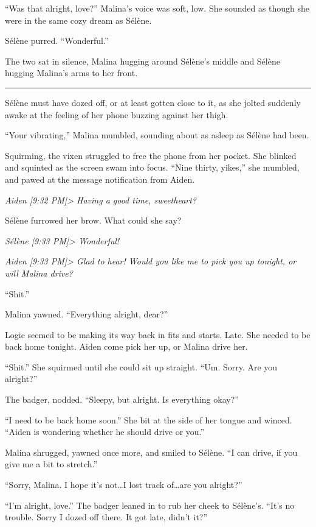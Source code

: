 ``Was that alright, love?'' Malina's voice was soft, low. She sounded as though she were in the same cozy dream as Sélène.

Sélène purred. ``Wonderful.''

The two sat in silence, Malina hugging around Sélène's middle and Sélène hugging Malina's arms to her front.

\begin{center}\rule{0.5\linewidth}{\linethickness}\end{center}

Sélène must have dozed off, or at least gotten close to it, as she jolted suddenly awake at the feeling of her phone buzzing against her thigh.

``Your vibrating,'' Malina mumbled, sounding about as asleep as Sélène had been.

Squirming, the vixen struggled to free the phone from her pocket. She blinked and squinted as the screen swam into focus. ``Nine thirty, yikes,'' she mumbled, and pawed at the message notification from Aiden.

\emph{Aiden {[}9:32 PM{]}\textgreater{} Having a good time, sweetheart?}

Sélène furrowed her brow. What could she say?

\emph{Sélène {[}9:33 PM{]}\textgreater{} Wonderful!}

\emph{Aiden {[}9:33 PM{]}\textgreater{} Glad to hear! Would you like me to pick you up tonight, or will Malina drive?}

``Shit.''

Malina yawned. ``Everything alright, dear?''

Logic seemed to be making its way back in fits and starts. Late. She needed to be back home tonight. Aiden come pick her up, or Malina drive her.

``Shit.'' She squirmed until she could sit up straight. ``Um. Sorry. Are you alright?''

The badger, nodded. ``Sleepy, but alright. Is everything okay?''

``I need to be back home soon.'' She bit at the side of her tongue and winced. ``Aiden is wondering whether he should drive or you.''

Malina shrugged, yawned once more, and smiled to Sélène. ``I can drive, if you give me a bit to stretch.''

``Sorry, Malina. I hope it's not\ldots{}I lost track of\ldots{}are you alright?''

``I'm alright, love.'' The badger leaned in to rub her cheek to Sélène's. ``It's no trouble. Sorry I dozed off there. It got late, didn't it?''

